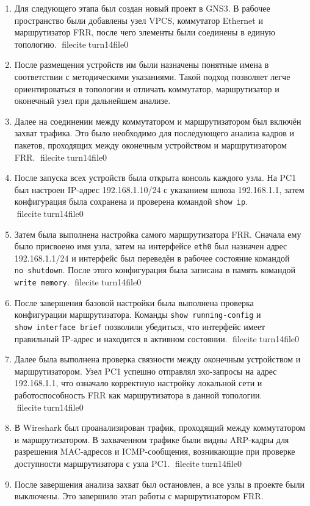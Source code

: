 \documentclass[
  english,
  russian,
  12pt,
  a4paper,
  DIV=11,
  numbers=noendperiod]{scrreprt}
\begin{document}
\begin{enumerate}
\def\labelenumi{\arabic{enumi}.}
\item
  Для следующего этапа был создан новый проект в GNS3. В рабочее
  пространство были добавлены узел VPCS, коммутатор Ethernet и
  маршрутизатор FRR, после чего элементы были соединены в единую
  топологию. fileciteturn14file0
\item
  После размещения устройств им были назначены понятные имена в
  соответствии с методическими указаниями. Такой подход позволяет легче
  ориентироваться в топологии и отличать коммутатор, маршрутизатор и
  оконечный узел при дальнейшем анализе.
\item
  Далее на соединении между коммутатором и маршрутизатором был включён
  захват трафика. Это было необходимо для последующего анализа кадров и
  пакетов, проходящих между оконечным устройством и маршрутизатором FRR.
  fileciteturn14file0
\item
  После запуска всех устройств была открыта консоль каждого узла. На PC1
  был настроен IP-адрес 192.168.1.10/24 с указанием шлюза 192.168.1.1,
  затем конфигурация была сохранена и проверена командой
  \texttt{show\ ip}. fileciteturn14file0
\item
  Затем была выполнена настройка самого маршрутизатора FRR. Сначала ему
  было присвоено имя узла, затем на интерфейсе \texttt{eth0} был
  назначен адрес 192.168.1.1/24 и интерфейс был переведён в рабочее
  состояние командой \texttt{no\ shutdown}. После этого конфигурация
  была записана в память командой \texttt{write\ memory}.
  fileciteturn14file0
\item
  После завершения базовой настройки была выполнена проверка
  конфигурации маршрутизатора. Команды \texttt{show\ running-config} и
  \texttt{show\ interface\ brief} позволили убедиться, что интерфейс
  имеет правильный IP-адрес и находится в активном состоянии.
  fileciteturn14file0
\item
  Далее была выполнена проверка связности между оконечным устройством и
  маршрутизатором. Узел PC1 успешно отправлял эхо-запросы на адрес
  192.168.1.1, что означало корректную настройку локальной сети и
  работоспособность FRR как маршрутизатора в данной топологии.
  fileciteturn14file0
\item
  В Wireshark был проанализирован трафик, проходящий между коммутатором
  и маршрутизатором. В захваченном трафике были видны ARP-кадры для
  разрешения MAC-адресов и ICMP-сообщения, возникающие при проверке
  доступности маршрутизатора с узла PC1. fileciteturn14file0
\item
  После завершения анализа захват был остановлен, а все узлы в проекте
  были выключены. Это завершило этап работы с маршрутизатором FRR.
\end{enumerate}
\end{document}
